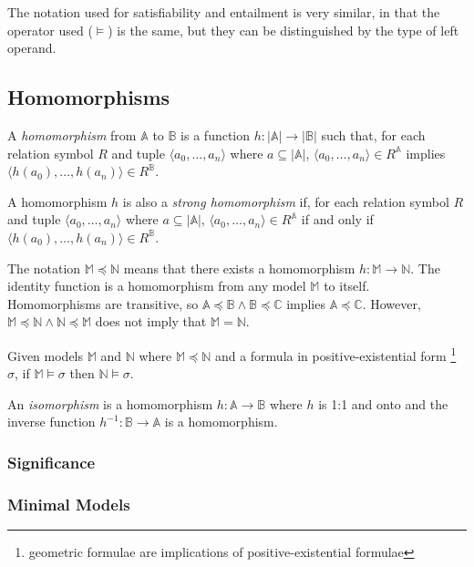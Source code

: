 			The notation used for satisfiability and entailment is very
			similar, in that the operator used ($\models$) is the same, but
			they can be distinguished by the type of left operand.

	\subsection{Homomorphisms}

		A \emph{homomorphism} from $\mathbb{A}$ to $\mathbb{B}$ is a function
		$h: |\mathbb{A}|\to|\mathbb{B}|$ such that, for each relation symbol
		$R$ and tuple $\langle a_0 , \ldots , a_n \rangle$ where $a \subseteq
		|\mathbb{A}|$, $\langle a_0 , \ldots , a_n  \rangle \in R^\mathbb{A}$
		implies $\langle h(a_0) , \ldots , h(a_n) \rangle \in R^\mathbb{B}$.

		A homomorphism $h$ is also a \emph{strong homomorphism} if, for each
		relation symbol $R$ and tuple $\langle a_0 , \ldots , a_n \rangle$
		where $a \subseteq |\mathbb{A}|$, $\langle a_0 , \ldots , a_n  \rangle
		\in R^\mathbb{A}$ if and only if $\langle h(a_0) , \ldots , h(a_n)
		\rangle \in R^\mathbb{B}$.

		The notation $\mathbb{M} \preceq \mathbb{N}$ means that there exists a
		homomorphism $h : \mathbb{M} \to \mathbb{N}$. The identity function is
		a homomorphism from any model $\mathbb{M}$ to itself.  Homomorphisms
		are transitive, so $\mathbb{A} \preceq \mathbb{B} \wedge \mathbb{B}
		\preceq \mathbb{C}$ implies $\mathbb{A} \preceq \mathbb{C}$. However,
		$\mathbb{M} \preceq \mathbb{N} \wedge \mathbb{N} \preceq \mathbb{M}$
		does not imply that $\mathbb{M} = \mathbb{N}$.

		Given models $\mathbb{M}$ and $\mathbb{N}$ where $\mathbb{M} \preceq
		\mathbb{N}$ and a formula in positive-existential form
		\footnote{geometric formulae are implications of positive-existential
		formulae} $\sigma$, if $\mathbb{M} \models \sigma$ then $\mathbb{N}
		\models \sigma$.

		An \emph{isomorphism} is a homomorphism $h : \mathbb{A} \to \mathbb{B}$
		where $h$ is 1:1 and onto and the inverse function $h^{-1} : \mathbb{B}
		\to \mathbb{A}$ is a homomorphism.

		\subsubsection{Significance}

			

		\subsubsection{Minimal Models}

